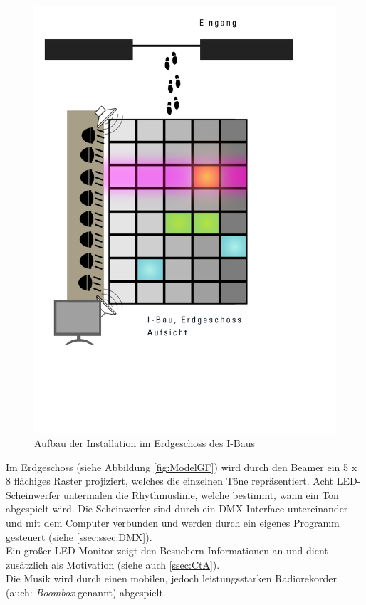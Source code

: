 \begin{figure}[htbp]
	\centering
		\includegraphics[width=1.0\textwidth]{images/ModelGroundFloor.png}
	\caption{Aufbau der Installation im Erdgeschoss des I-Baus}
	\label{fig:ModelGF}
\end{figure}

Im Erdgeschoss (siehe Abbildung \autoref{fig:ModelGF}) wird durch den Beamer ein 5 x 8 flächiges Raster projiziert, welches die einzelnen Töne repräsentiert. Acht LED-Scheinwerfer untermalen die Rhythmuslinie, welche bestimmt, wann ein Ton abgespielt wird. Die Scheinwerfer sind durch ein DMX-Interface untereinander und mit dem Computer verbunden und werden durch ein eigenes Programm gesteuert (siehe \autoref{ssec:ssec:DMX}).\\
Ein großer LED-Monitor zeigt den Besuchern Informationen an und dient zusätzlich als Motivation (siehe auch \autoref{ssec:CtA}).\\
Die Musik wird durch einen mobilen, jedoch leistungsstarken Radiorekorder (auch: \textit{Boombox} genannt) abgespielt.